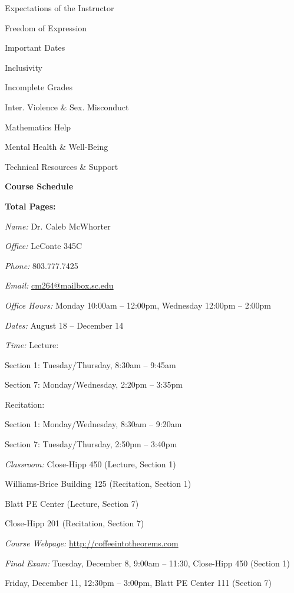 \documentclass[11pt,letterpaper]{article}
\makeatletter
\newcommand{\classdates}{August 18 -- December 14}
\newcommand{\classtimes}{Lecture: \par\hspace{1.5cm} Section 1: Tuesday/Thursday, 8:30am -- 9:45am \par\hspace{1.5cm} Section 7: Monday/Wednesday, 2:20pm -- 3:35pm \par Recitation: \par\hspace{1.5cm} Section 1: Monday/Wednesday, 8:30am -- 9:20am \par\hspace{1.5cm} Section 7: Tuesday/Thursday, 2:50pm -- 3:40pm}
\newcommand{\classroom}{Close-Hipp 450 (Lecture, Section 1) \par\hspace{1.85cm} Williams-Brice Building 125 (Recitation, Section 1) \par\hspace{1.85cm} Blatt PE Center (Lecture, Section 7) \par\hspace{1.85cm} Close-Hipp 201 (Recitation, Section 7)}
\newcommand{\instructor}{Dr. Caleb McWhorter}
\newcommand{\office}{LeConte 345C}
\newcommand{\phone}{803.777.7425}
\newcommand{\email}{cm264@mailbox.sc.edu}
\newcommand{\website}{http://coffeeintotheorems.com}
\newcommand{\officehours}{Monday 10:00am -- 12:00pm, Wednesday 12:00pm -- 2:00pm}
\makeatother
\begin{document}
\begin{minipage}[t]{0.45\textwidth}
\hspace{0.3cm} Expectations of the Instructor \dotfill \pageref{univ_instructorexp} \par
\hspace{0.3cm} Freedom of Expression \dotfill \pageref{univ_freedexpression} \par
\hspace{0.3cm} Important Dates \dotfill \pageref{univ_dates} \par
\hspace{0.3cm} Inclusivity \dotfill \pageref{univ_inclusion} \par
\hspace{0.3cm} Incomplete Grades \dotfill \pageref{univ_incomplete} \par
\hspace{0.3cm} Inter. Violence \& Sex. Misconduct \dotfill \pageref{univ_viosexmis} \par
\hspace{0.3cm} Mathematics Help \dotfill \pageref{univ_mathhelp} \par
\hspace{0.3cm} Mental Health \& Well-Being \dotfill \pageref{univ_mental} \par
\hspace{0.3cm} Technical Resources \& Support \dotfill \pageref{univ_techsupport} \par
{\bfseries\color{scred} Course Schedule} \dotfill \pageref{schd} \par
\hfill {\bfseries\color{scred} Total Pages:} \pageref*{LastPage}
\end{minipage}
\pvspace{0.1cm}




\vspace{-0.1cm}  \vspace{-0.3cm}

\textit{Name:} \instructor \par
\textit{Office:} \office \par
\textit{Phone:} \phone \par
\textit{Email:} \href{mailto:\email}{\email} \par
\textit{Office Hours:} \officehours 
\pvspace{0.4cm}



\textit{Dates:} \classdates \par
\textit{Time:} \classtimes \par
\textit{Classroom:} \classroom \par
\textit{Course Webpage:} \href{\website}{\website} \par
\textit{Final Exam:} Tuesday, December 8, 9:00am -- 11:30, Close-Hipp 450 (Section 1) \par\hspace{2cm} Friday, December 11, 12:30pm -- 3:00pm, Blatt PE Center 111 (Section 7)
\sectionbreak
\end{document}
